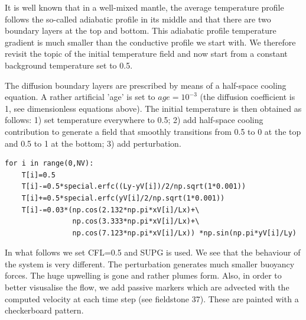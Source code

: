 It is well known that in a well-mixed mantle, the average temperature profile 
follows the so-called adiabatic profile in its middle and that there are two 
boundary layers at the top and bottom. This adiabatic profile temperature gradient 
is much smaller than the conductive profile we start with.
We therefore revisit the topic of the initial temperature field and now start 
from a constant background temperature set to 0.5. 

The diffusion boundary layers are prescribed by means of a half-space cooling equation.
A rather artificial 'age' is set to $age=10^{-3}$ (the diffusion coefficient is 1, 
see dimensionless equations above).
The initial temperature is then obtained as follows: 1) set temperature everywhere to 0.5; 
2) add half-space cooling contribution to generate a field that smoothly transitions 
from 0.5 to 0 at the top and 0.5 to 1 at the bottom; 3) add perturbation. 

\begin{lstlisting}
for i in range(0,NV):
    T[i]=0.5
    T[i]-=0.5*special.erfc((Ly-yV[i])/2/np.sqrt(1*0.001))
    T[i]+=0.5*special.erfc(yV[i]/2/np.sqrt(1*0.001))
    T[i]-=0.03*(np.cos(2.132*np.pi*xV[i]/Lx)+\
                np.cos(3.333*np.pi*xV[i]/Lx)+\
                np.cos(7.123*np.pi*xV[i]/Lx)) *np.sin(np.pi*yV[i]/Ly)
\end{lstlisting}


In what follows we set CFL=0.5 and SUPG is used.
We see that the behaviour of the system is very different. The perturbation generates 
much smaller buoyancy forces. The huge upwelling is gone and rather plumes form. 
Also, in order to better visusalise the flow, we add passive markers which are 
advected with the computed velocity at each time step (see fieldstone 37).
These are painted with a checkerboard pattern.

\newpage

